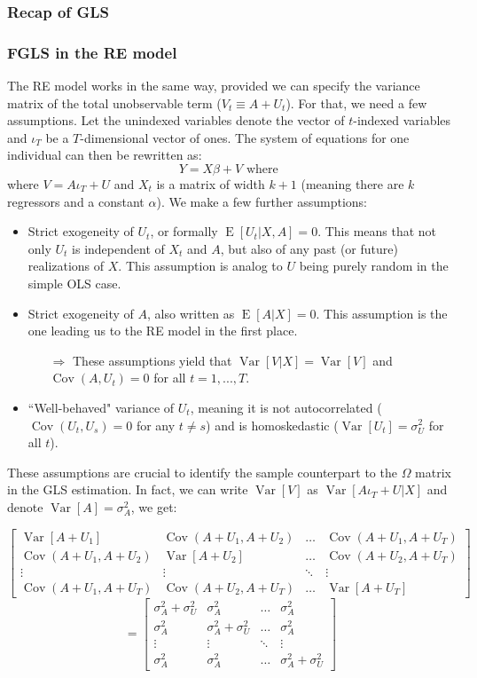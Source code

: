 \documentclass[12pt]{report}
\newcommand{\E}[1]{\operatorname{E}\left[#1\right]}
\newcommand{\V}[1]{\operatorname{Var}\left[#1\right]}
\newcommand{\cov}[1]{\operatorname{Cov}\left(#1\right)}
\begin{document}
\subsubsection{Recap of GLS}



\subsubsection{FGLS in the RE model}

The RE model works in the same way, provided we can specify the variance matrix of the total unobservable term ($V_t \equiv  A + U_t$). For that, we need a few assumptions. Let the unindexed variables denote the vector of $t$-indexed variables and $\iota_T$ be a $T$-dimensional vector of ones. The system of equations for one individual can then be rewritten as: $$Y = X\beta + V \text{ where }$$ where $V = A\iota_T + U$ and $X_t$ is a matrix of width $k+1$ (meaning there are $k$ regressors and a constant $\alpha$). We make a few further assumptions:\begin{itemize}
\item Strict exogeneity of $U_t$, or formally $\E{U_t\vert X, A} = 0$. This means that not only $U_t$ is independent of $X_t$ and $A$, but also of any past (or future) realizations of $X$. This assumption is analog to $U$ being purely random in the simple OLS case.
\item Strict exogeneity of $A$, also written as $\E{A\vert X} = 0$. This assumption is the one leading us to the RE model in the first place.
\begin{itemize}
\item[$\Rightarrow$] These assumptions yield that $\V{V\vert X} = \V{V}$ and $\cov{A, U_t} = 0$ for all $t =1, ..., T$.
\end{itemize}
\item ``Well-behaved" variance of $U_t$, meaning it is not autocorrelated ($\cov{U_t, U_s} = 0$ for any $t\neq s$) and is homoskedastic ($\V{U_t} = \sigma_U^2$ for all $t$).
\end{itemize}
These assumptions are crucial to identify the sample counterpart to the $\Omega$ matrix in the GLS estimation. In fact, we can write $\V{V}$ as $\V{A\iota_T + U\vert X}$ and denote $\V{A} = \sigma_A^2$, we get: 

$$\begin{bmatrix}
\V{A + U_1} & \cov{A + U_1, A+ U_2} & \dots & \cov{A + U_1, A+ U_T} \\
\cov{A + U_1, A+ U_2} & \V{A + U_2} & \dots & \cov{A + U_2, A+ U_T} \\
\vdots & \vdots & \ddots & \vdots \\
\cov{A + U_1, A+ U_T} & \cov{A + U_2, A+ U_T} & \dots & \V{A + U_T} 
\end{bmatrix}
$$
$$= \begin{bmatrix}
\sigma_A^2 + \sigma_U^2 & \sigma_A^2 & \dots & \sigma_A^2 \\
\sigma_A^2 & \sigma_A^2 + \sigma_U^2 & \dots & \sigma_A^2 \\
\vdots & \vdots & \ddots & \vdots \\
\sigma_A^2 & \sigma_A^2 & \dots & \sigma_A^2 + \sigma_U^2
\end{bmatrix}
$$
\end{document}
